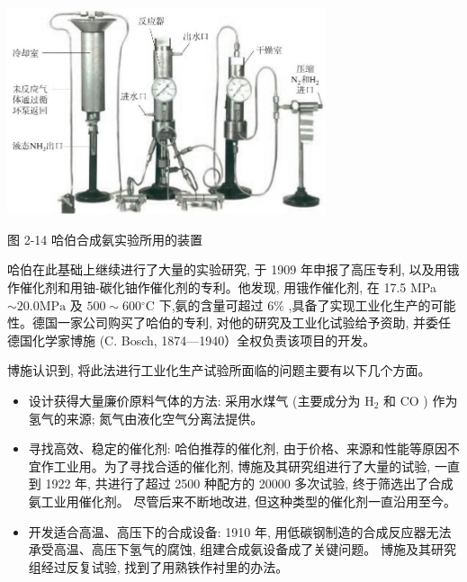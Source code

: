 \documentclass[10pt]{article}
\begin{document}
\begin{center}
\includegraphics[max width=0.7\textwidth]{images/0190da9d-8bfd-732f-bc2c-0b21d0f13b91_55_266610.jpg}
\end{center}

图 2-14 哈伯合成氨实验所用的装置

哈伯在此基础上继续进行了大量的实验研究, 于 1909 年申报了高压专利, 以及用锇作催化剂和用铀-碳化铀作催化剂的专利。他发现, 用锇作催化剂, 在 17.5 MPa \(\sim {20.0}\mathrm{{MPa}}\) 及 \({500} \sim {600}{}^{ \circ }\mathrm{C}\) 下,氨的含量可超过 \(6\%\) ,具备了实现工业化生产的可能性。德国一家公司购买了哈伯的专利, 对他的研究及工业化试验给予资助, 并委任德国化学家博施 (C. Bosch, 1874—1940）全权负责该项目的开发。

博施认识到, 将此法进行工业化生产试验所面临的问题主要有以下几个方面。

\begin{itemize}
\item 设计获得大量廉价原料气体的方法: 采用水煤气 (主要成分为 \({\mathrm{H}}_{2}\) 和 \(\mathrm{{CO}}\) ) 作为氢气的来源; 氮气由液化空气分离法提供。
\end{itemize}

\begin{itemize}
\item 寻找高效、稳定的催化剂: 哈伯推荐的催化剂, 由于价格、来源和性能等原因不宜作工业用。为了寻找合适的催化剂, 博施及其研究组进行了大量的试验, 一直到 1922 年, 共进行了超过 2500 种配方的 20000 多次试验, 终于筛选出了合成氨工业用催化剂。 尽管后来不断地改进, 但这种类型的催化剂一直沿用至今。
\end{itemize}

\begin{itemize}
\item 开发适合高温、高压下的合成设备: 1910 年, 用低碳钢制造的合成反应器无法承受高温、高压下氢气的腐蚀, 组建合成氨设备成了关键问题。 博施及其研究组经过反复试验, 找到了用熟铁作衬里的办法。
\end{itemize}
\end{document}

